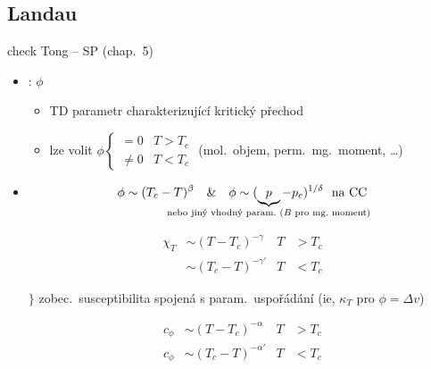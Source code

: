 \subsection{Landau}
{\color{NavyBlue}\small check Tong -- SP (chap.\ 5)}
\begin{itemize}
  \item {}: $\phi$
  \begin{itemize}[nosep]
    \item[--] TD parametr charakterizující kritický přechod
    \item[--] lze volit \quad $\phi \begin{cases} = 0 & T > T_c \\ \neq 0 & T < T_c \end{cases}$ \qquad (mol.\ objem, perm.\ mg.\ moment, \dots)
  \end{itemize}
  \item {}
  \begin{definice}
  \[ \phi\sim(T_c - T)^{\beta} \quad\&\quad \phi\sim(\underbrace{p}_{\mathclap{\text{nebo jiný vhodný param.\ ($B$ pro mg.\ moment)}}} - p_c)^{1/\delta}\ \text{ na CC} \]
  \vspace{4pt}
  \begin{minipage}{0.45\textwidth}
  \begin{align*}
    \chi_T &\sim (T - T_c)^{-\gamma} & T &> T_c \\
           &\sim (T_c - T)^{-\gamma'} & T &< T_c
  \end{align*}
  \end{minipage}
  \begin{minipage}{0.5\textwidth}
  $\Big\}$ zobec.\ susceptibilita spojená s param.\ uspořádání {\color{NavyBlue}\small (ie, $\kappa_T$ pro $\phi = \Delta v$)}
  \end{minipage}
  \begin{align*}
    c_\phi &\sim (T - T_c)^{-\alpha} & T &> T_c \\
    c_\phi &\sim (T_c - T)^{-\alpha'} & T &< T_c
  \end{align*}
  \end{definice}
\end{itemize}

